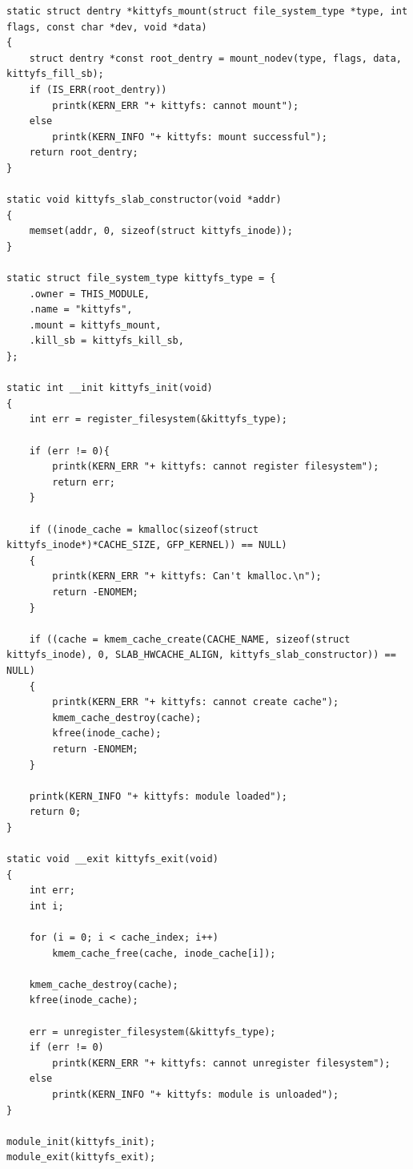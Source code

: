 \begin{lstlisting}
static struct dentry *kittyfs_mount(struct file_system_type *type, int flags, const char *dev, void *data)
{
    struct dentry *const root_dentry = mount_nodev(type, flags, data, kittyfs_fill_sb);
    if (IS_ERR(root_dentry))
        printk(KERN_ERR "+ kittyfs: cannot mount");
    else
        printk(KERN_INFO "+ kittyfs: mount successful");
    return root_dentry;
}

static void kittyfs_slab_constructor(void *addr)
{
    memset(addr, 0, sizeof(struct kittyfs_inode));
}

static struct file_system_type kittyfs_type = {
    .owner = THIS_MODULE,
    .name = "kittyfs",
    .mount = kittyfs_mount,
    .kill_sb = kittyfs_kill_sb,
};

static int __init kittyfs_init(void)
{
    int err = register_filesystem(&kittyfs_type);

    if (err != 0){
        printk(KERN_ERR "+ kittyfs: cannot register filesystem");
        return err;
    }

    if ((inode_cache = kmalloc(sizeof(struct kittyfs_inode*)*CACHE_SIZE, GFP_KERNEL)) == NULL)
    {
        printk(KERN_ERR "+ kittyfs: Can't kmalloc.\n");
        return -ENOMEM;
    }

    if ((cache = kmem_cache_create(CACHE_NAME, sizeof(struct kittyfs_inode), 0, SLAB_HWCACHE_ALIGN, kittyfs_slab_constructor)) == NULL)
    {
        printk(KERN_ERR "+ kittyfs: cannot create cache");
        kmem_cache_destroy(cache);
        kfree(inode_cache); 
        return -ENOMEM;
    }

    printk(KERN_INFO "+ kittyfs: module loaded");
    return 0;
}

static void __exit kittyfs_exit(void)
{
    int err;
    int i;
    
    for (i = 0; i < cache_index; i++)
    	kmem_cache_free(cache, inode_cache[i]);
    
    kmem_cache_destroy(cache);
    kfree(inode_cache);

    err = unregister_filesystem(&kittyfs_type);
    if (err != 0)
        printk(KERN_ERR "+ kittyfs: cannot unregister filesystem");
    else
        printk(KERN_INFO "+ kittyfs: module is unloaded");
}

module_init(kittyfs_init);
module_exit(kittyfs_exit);
\end{lstlisting}






